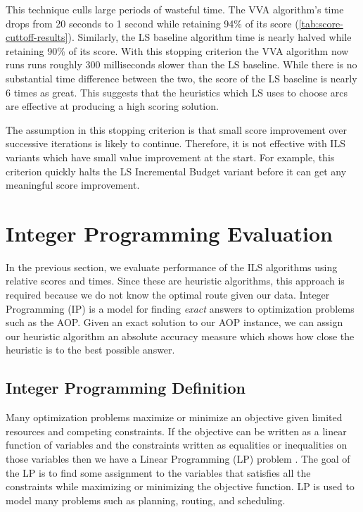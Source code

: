\documentclass[honors]{union-cs-thesis}
\begin{document}
This technique culls large periods of wasteful time. The VVA algorithm's time drops from 20 seconds to 1 second while retaining 94\% of its score (\cref{tab:score-cuttoff-results}). Similarly, the LS baseline algorithm time is nearly halved while retaining 90\% of its score. With this stopping criterion the VVA algorithm now runs runs roughly 300 milliseconds slower than the LS baseline. While there is no substantial time difference between the two, the score of the LS baseline is nearly 6 times as great. This suggests that the heuristics which LS uses to choose arcs are effective at producing a high scoring solution.

The assumption in this stopping criterion is that small score improvement over successive iterations is likely to continue. Therefore, it is not effective with ILS variants which have small value improvement at the start. For example, this criterion quickly halts the LS Incremental Budget variant before it can get any meaningful score improvement. 


\section{Integer Programming Evaluation}
\label{sec:int-programming}
In the previous section, we evaluate performance of the ILS algorithms using relative scores and times. Since these are heuristic algorithms, this approach is required because we do not know the optimal route given our data. Integer Programming (IP) is a model for finding \emph{exact} answers to optimization problems such as the AOP. Given an exact solution to our AOP instance, we can assign our heuristic algorithm an absolute accuracy measure which shows how close the heuristic is to the best possible answer.

\subsection{Integer Programming Definition}
Many optimization problems maximize or minimize an objective given limited resources and competing constraints. If the objective can be written as a linear function of variables and the constraints written as equalities or inequalities on those variables then we have a Linear Programming (LP) problem \cite{clrs}. The goal of the LP is to find some assignment to the variables that satisfies all the constraints while maximizing or minimizing the objective function. LP is used to model many problems such as planning, routing, and scheduling.
\end{document}

